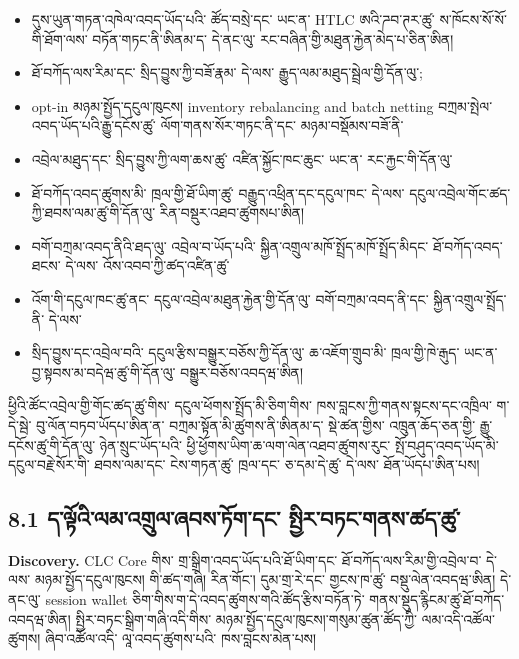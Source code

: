 \documentclass[11pt]{article}
\begin{document}
\begin{itemize}[leftmargin=*]
\item དུས་ཡུན་གཏན་འཁེལ་འབད་ཡོད་པའི་ ཚོད་བསྲེ་དང་ ཡང་ན་ HTLC ཨའི་ཌབ་ཊར་ཚུ་ ས་ཁོངས་སོ་སོ་གི་ཐོག་ལས་ བཏོན་གཏང་ནི་ཨིནམ་ད་ དེ་ནང་ལུ་ རང་བཞིན་གྱི་མཐུན་རྐྱེན་མེད་པ་ཅིན་ཨིན།
\item ཐོ་བཀོད་ལས་རིམ་དང་ སྲིད་བྱུས་ཀྱི་བཟོ་རྣམ་ དེ་ལས་ རྒྱུད་ལམ་མཐུད་སྦྲེལ་གྱི་དོན་ལུ་;
\item opt-in མཉམ་སྤྱོད་དངུལ་ཁུངས། inventory rebalancing and batch netting བཀྲམ་སྤེལ་འབད་ཡོད་པའི་རྒྱུ་དངོས་ཚུ་ ལོག་གནས་སོར་གཏང་ནི་དང་ མཉམ་བསྡོམས་བཟོ་ནི་
\item འབྲེལ་མཐུད་དང་ སྲིད་བྱུས་ཀྱི་ལག་ཆས་ཚུ་ འཛིན་སྐྱོང་ཁང་ཆུང་ ཡང་ན་ རང་རྐྱང་གི་དོན་ལུ་
\item ཐོ་བཀོད་འབད་ཚུགས་མི་ ཁྲལ་གྱི་ཐོ་ཡིག་ཚུ་ བརྒྱུད་འཕྲིན་དང་དངུལ་ཁང་ དེ་ལས་ དངུལ་འབྲེལ་གོང་ཚད་ཀྱི་ཐབས་ལམ་ཚུ་གི་དོན་ལུ་ རིན་བསྡུར་འཐབ་ཚུགསཔ་ཨིན།
\item བགོ་བཀྲམ་འབད་ནིའི་ཐད་ལུ་ འབྲེལ་བ་ཡོད་པའི་ སྐྱིན་འགྲུལ་མཁོ་སྤྲོད་མཁོ་སྤྲོད་མིདང་ ཐོ་བཀོད་འབད་ཐངས་ དེ་ལས་ འོས་འབབ་ཀྱི་ཚད་འཛིན་ཚུ་
\item འོག་གི་དངུལ་ཁང་ཚུ་ནང་ དངུལ་འབྲེལ་མཐུན་རྐྱེན་གྱི་དོན་ལུ་ བགོ་བཀྲམ་འབད་ནི་དང་ སྐྱིན་འགྲུལ་སྤྲོད་ནི་ དེ་ལས་
\item སྲིད་བྱུས་དང་འབྲེལ་བའི་ དངུལ་རྩིས་བསྒྱུར་བཅོས་ཀྱི་དོན་ལུ་ ཆ་འཇོག་གྲུབ་མི་ ཁྲལ་གྱི་ཁེ་རྒུད་ ཡང་ན་ བྱ་སྟབས་མ་བདེཝ་ཚུ་གི་དོན་ལུ་ བསྒྱུར་བཅོས་འབདཝ་ཨིན།
\end{itemize}
ཕྱིའི་ཚོང་འབྲེལ་གྱི་གོང་ཚད་ཚུ་གིས་ དངུལ་ཕོགས་སྤྲོད་མི་ཅིག་གིས་ ཁས་བླངས་ཀྱི་གནས་སྟངས་དང་འཁྲིལ་ ག་དེ་སྦེ་ བུ་ལོན་བཏབ་ཡོདཔ་ཨིན་ན་ བཀྲམ་སྟོན་མི་ཚུགས་ནི་ཨིནམ་ད་ སྡེ་ཚན་གྱིས་ འཁྲུན་ཆོད་ཅན་གྱི་ རྒྱུ་དངོས་ཚུ་གི་དོན་ལུ་ ཉེན་སྲུང་ཡོད་པའི་ ཕྱི་ཕྱོགས་ཡིག་ཆ་ལག་ལེན་འཐབ་ཚུགས་རུང་ སྤོ་བཤུད་འབད་ཡོད་མི་དངུལ་བརྗེ་སོར་གི་ ཐབས་ལམ་དང་ ངེས་གཏན་ཚུ་ ཁྲལ་དང་ ཅ་དམ་དེ་ཚུ་ དེ་ལས་ ཐོན་ཡོདཔ་ཨིན་པས།

\subsection*{8.1 ད་ལྟོའི་ལམ་འགྲུལ་ཞབས་ཏོག་དང་ སྤྱིར་བཏང་གནས་ཚད་ཚུ་}

\textbf{Discovery.} CLC Core གིས་ གྲ་སྒྲིག་འབད་ཡོད་པའི་ཐོ་ཡིག་དང་ ཐོ་བཀོད་ལས་རིམ་གྱི་འབྲེལ་བ་ དེ་ལས་ མཉམ་སྤྱོད་དངུལ་ཁུངས། གི་ཚད་གཞི། རིན་གོང་། དུམ་གྲ་རེ་དང་ གྱངས་ཁ་ཚུ་ བསྡུ་ལེན་འབདཝ་ཨིན། དེ་ནང་ལུ་ session wallet ཅིག་གིས་ག་དེ་འབད་ཚུགས་གའི་ཚོད་རྩིས་བཏོན་ཏེ་ གནས་སྡུད་རྙིངམ་ཚུ་ཐོ་བཀོད་འབདཝ་ཨིན། སྤྱིར་བཏང་སྒྲིག་གཞི་འདི་གིས་ མཉམ་སྤྱོད་དངུལ་ཁུངས།་གསུམ་ཚུན་ཚོད་ཀྱི་ ལམ་འདི་འཚོལ་ཚུགས། ཞིབ་འཚོལ་འདི་ ལཱ་འབད་ཚུགས་པའི་ ཁས་བླངས་མེན་པས།
\end{document}
